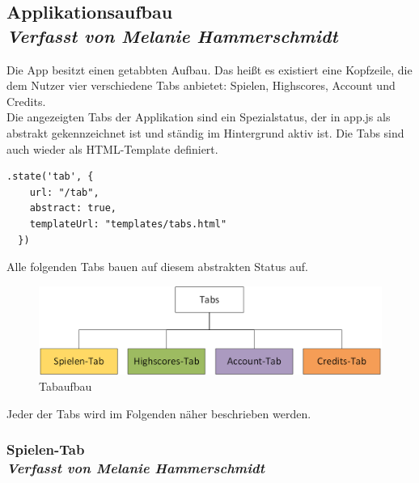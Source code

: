 \subsection[Applikationsaufbau]{Applikationsaufbau
 \\ \textnormal{\small{\textit {Verfasst von Melanie Hammerschmidt}}}}
 
Die App besitzt einen getabbten Aufbau. Das heißt es existiert eine Kopfzeile, die dem Nutzer vier verschiedene Tabs anbietet: Spielen, Highscores, Account und Credits. 
\\
Die angezeigten Tabs der Applikation sind ein Spezialstatus, der in app.js als abstrakt gekennzeichnet ist und ständig im Hintergrund aktiv ist. Die Tabs sind auch wieder als HTML-Template definiert.
\begin{lstlisting}
.state('tab', {
    url: "/tab",
    abstract: true,
    templateUrl: "templates/tabs.html"
  })
\end{lstlisting}
Alle folgenden Tabs bauen auf diesem abstrakten Status auf.
\begin{figure}[h]
\centering
\includegraphics[width=1\textwidth]{ref/images/tabs.png}
\caption[Tabaufbau]{Tabaufbau}
\label{fig:Tabaufbau}
\end{figure}

Jeder der Tabs wird im Folgenden näher beschrieben werden.
\newpage
\subsubsection[Spielen-Tab]{Spielen-Tab
 \\ \textnormal{\small{\textit {Verfasst von Melanie Hammerschmidt}}}}
 
